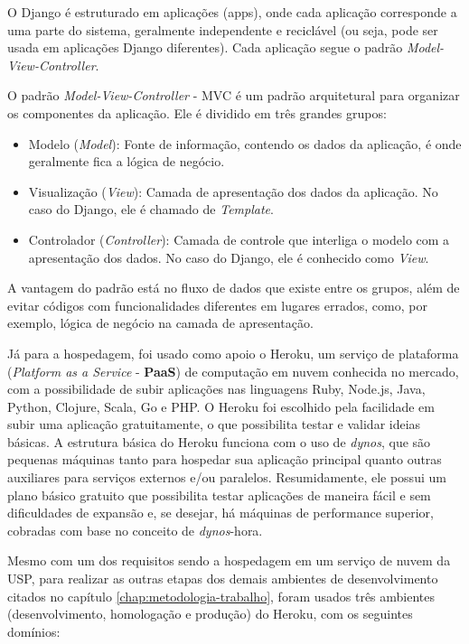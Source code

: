 O Django é estruturado em aplicações (apps), onde cada aplicação corresponde a uma parte do sistema, geralmente independente e reciclável (ou seja, pode ser usada em aplicações Django diferentes). Cada aplicação segue o padrão \textit{Model-View-Controller}.

O padrão \textit{Model-View-Controller} - MVC é um padrão arquitetural para organizar os componentes da aplicação. Ele é dividido em três grandes grupos\cite{thedjangobook2018}:

\begin{itemize}
    \item Modelo (\textit{Model}): Fonte de informação, contendo os dados da aplicação, é onde geralmente fica a lógica de negócio.
    \item Visualização (\textit{View}): Camada de apresentação dos dados da aplicação. No caso do Django, ele é chamado de \textit{Template}.
    \item Controlador (\textit{Controller}): Camada de controle que interliga o modelo com a apresentação dos dados. No caso do Django, ele é conhecido como \textit{View}.
\end{itemize}

A vantagem do padrão está no fluxo de dados que existe entre os grupos, além de evitar códigos com funcionalidades diferentes em lugares errados, como, por exemplo, lógica de negócio na camada de apresentação.

Já para a hospedagem, foi usado como apoio o Heroku, um serviço de plataforma (\textit{Platform as a Service} - \textbf{PaaS}) de computação em nuvem conhecida no mercado, com a possibilidade de subir aplicações nas linguagens Ruby, Node.js, Java, Python, Clojure, Scala, Go e PHP. O Heroku foi escolhido pela facilidade em subir uma aplicação gratuitamente, o que possibilita testar e validar ideias básicas. A estrutura básica do Heroku funciona com o uso de \textit{dynos}, que são pequenas máquinas tanto para hospedar sua aplicação principal quanto outras auxiliares para serviços externos e/ou paralelos. Resumidamente, ele possui um plano básico gratuito que possibilita testar aplicações de maneira fácil e sem dificuldades de expansão e, se desejar, há máquinas de performance superior, cobradas com base no conceito de \textit{dynos}-hora.

Mesmo com um dos requisitos sendo a hospedagem em um serviço de nuvem da USP, para realizar as outras etapas dos demais ambientes de desenvolvimento citados no capítulo \ref{chap:metodologia-trabalho}, foram usados três ambientes (desenvolvimento, homologação e produção) do Heroku, com os seguintes domínios:

